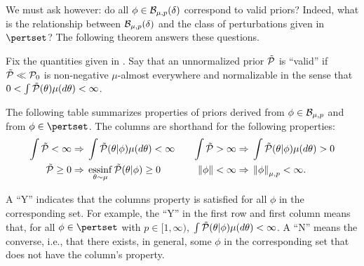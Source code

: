 We must ask however: do all $\phi \in \mathcal{B}_{\mu,p}(\delta)$ correspond to
valid priors?  Indeed, what is the relationship between
$\mathcal{B}_{\mu,p}(\delta)$ and the class of perturbations given in
$\pertset$?  The following theorem answers these questions.


\begin{thm}
%
Fix the quantities given in .  Say that an unnormalized
prior $\tilde{\mathcal{P}}$ is ``valid'' if $\tilde{\mathcal{P}} \ll \mathcal{P}_{0}$ is non-negative
$\mu$-almost everywhere and normalizable in the sense that $0 < \int
\tilde{\mathcal{P}}(\theta) \mu(d\theta) < \infty$.

The following table summarizes properties of priors derived from
$\phi \in \mathcal{B}_{\mu,p}$ and from $\phi \in \pertset$.  The columns are
shorthand for the following properties:
%
\begin{align*}
%
\int \ptil < \infty \Rightarrow{}&
    \int \ptil(\theta \vert \phi) \mu(d\theta) < \infty   &\quad
%
\int \ptil > \infty \Rightarrow{}&
    \int \ptil(\theta \vert \phi) \mu(d\theta) > 0\\
%
\ptil \ge 0 \Rightarrow{}&
    \essinf_{\theta \sim \mu} \ptil(\theta \vert \phi) \ge 0  &\quad
\norm{\phi} < \infty \Rightarrow{}& \norm{\phi}_{\mu,p} < \infty.
%
\end{align*}

A ``Y'' indicates that the columns property is satisfied for all $\phi$ in the
corresponding set.  For example, the ``Y'' in the first row and first column
means that, for all $\phi \in \pertset$ with $p \in [1, \infty)$, $\int
\tilde{\mathcal{P}}(\theta \vert \phi) \mu(d\theta) < \infty$.  A ``N'' means the converse,
i.e., that there exists, in general, some $\phi$ in the corresponding set that
does not have the column's property.


\end{thm}
